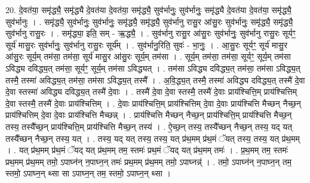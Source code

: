\documentclass[17pt]{extarticle}
\begin{document}
20. दे॒वत॑या॒ समृ॑द्ध्यै॒ समृ॑द्ध्यै दे॒वत॑या दे॒वत॑या॒ समृ॑द्ध्यै॒ सुव॑र्भानुः॒ सुव॑र्भानुः॒ समृ॑द्ध्यै दे॒वत॑या दे॒वत॑या॒ समृ॑द्ध्यै॒ सुव॑र्भानुः । . समृ॑द्ध्यै॒ सुव॑र्भानुः॒ सुव॑र्भानुः॒ समृ॑द्ध्यै॒ समृ॑द्ध्यै॒ सुव॑र्भानु रासु॒र आ॑सु॒रः सुव॑र्भानुः॒ समृ॑द्ध्यै॒ समृ॑द्ध्यै॒ सुव॑र्भानु रासु॒रः । . समृ॑द्ध्या॒ इति॒ सम् - ऋ॒द्ध्यै॒ । . सुव॑र्भानु रासु॒र आ॑सु॒रः सुव॑र्भानुः॒ सुव॑र्भानु रासु॒रः सूर्यꣳ॒॒ सूर्य॑ मासु॒रः सुव॑र्भानुः॒ सुव॑र्भानु रासु॒रः सूर्य᳚म् । . सुव॑र्भानु॒रिति॒ सुवः॑ - भा॒नुः॒ । . आ॒सु॒रः सूर्यꣳ॒॒ सूर्य॑ मासु॒र आ॑सु॒रः सूर्य॒म् तम॑सा॒ तम॑सा॒ सूर्य॑ मासु॒र आ॑सु॒रः सूर्य॒म् तम॑सा । . सूर्य॒म् तम॑सा॒ तम॑सा॒ सूर्यꣳ॒॒ सूर्य॒म् तम॑सा ऽविद्ध्य दविद्ध्य॒त् तम॑सा॒ सूर्यꣳ॒॒ सूर्य॒म् तम॑सा ऽविद्ध्यत् । . तम॑सा ऽविद्ध्य दविद्ध्य॒त् तम॑सा॒ तम॑सा ऽविद्ध्य॒त् तस्मै॒ तस्मा॑ अविद्ध्य॒त् तम॑सा॒ तम॑सा ऽविद्ध्य॒त् तस्मै᳚ । . अ॒वि॒द्ध्य॒त् तस्मै॒ तस्मा॑ अविद्ध्य दविद्ध्य॒त् तस्मै॑ दे॒वा दे॒वा स्तस्मा॑ अविद्ध्य दविद्ध्य॒त् तस्मै॑ दे॒वाः । . तस्मै॑ दे॒वा दे॒वा स्तस्मै॒ तस्मै॑ दे॒वाः प्राय॑श्चित्ति॒म् प्राय॑श्चित्तिम् दे॒वा स्तस्मै॒ तस्मै॑ दे॒वाः प्राय॑श्चित्तिम् । . दे॒वाः प्राय॑श्चित्ति॒म् प्राय॑श्चित्तिम् दे॒वा दे॒वाः प्राय॑श्चित्ति मैच्छन् नैच्छ॒न् प्राय॑श्चित्तिम् दे॒वा दे॒वाः प्राय॑श्चित्ति मैच्छन्न् । . प्राय॑श्चित्ति मैच्छन् नैच्छ॒न् प्राय॑श्चित्ति॒म् प्राय॑श्चित्ति मैच्छ॒न् तस्य॒ तस्यै᳚च्छ॒न् प्राय॑श्चित्ति॒म् प्राय॑श्चित्ति मैच्छ॒न् तस्य॑ । . ऐ॒च्छ॒न् तस्य॒ तस्यै᳚च्छन् नैच्छ॒न् तस्य॒ यद् यत् तस्यै᳚च्छन् नैच्छ॒न् तस्य॒ यत् । . तस्य॒ यद् यत् तस्य॒ तस्य॒ यत् प्र॑थ॒मम् प्र॑थ॒मं ॅयत् तस्य॒ तस्य॒ यत् प्र॑थ॒मम् । . यत् प्र॑थ॒मम् प्र॑थ॒मं ॅयद् यत् प्र॑थ॒मम् तम॒ स्तमः॑ प्रथ॒मं ॅयद् यत् प्र॑थ॒मम् तमः॑ । . प्र॒थ॒मम् तम॒ स्तमः॑ प्रथ॒मम् प्र॑थ॒मम् तमो॒ ऽपाघ्न॑न् न॒पाघ्न॒न् तमः॑ प्रथ॒मम् प्र॑थ॒मम् तमो॒ ऽपाघ्नन्न्॑ । . तमो॒ ऽपाघ्न॑न् न॒पाघ्न॒न् तम॒ स्तमो॒ ऽपाघ्न॒न् थ्सा सा ऽपाघ्न॒न् तम॒ स्तमो॒ ऽपाघ्न॒न् थ्सा । \newline
\end{document}
